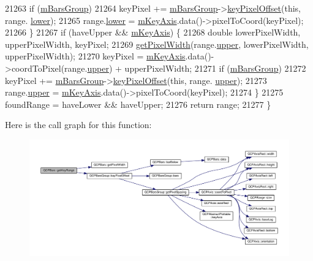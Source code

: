 \begin{DoxyCode}
21263     \textcolor{keywordflow}{if} (\hyperlink{class_q_c_p_bars_a9f59c255f3739182ca9744dff75beaa9}{mBarsGroup})
21264       keyPixel += \hyperlink{class_q_c_p_bars_a9f59c255f3739182ca9744dff75beaa9}{mBarsGroup}->\hyperlink{class_q_c_p_bars_group_a8e2ca6002e7bab49670144d048a2bcc9}{keyPixelOffset}(\textcolor{keyword}{this}, range.
      \hyperlink{class_q_c_p_range_aa3aca3edb14f7ca0c85d912647b91745}{lower});
21265     range.\hyperlink{class_q_c_p_range_aa3aca3edb14f7ca0c85d912647b91745}{lower} = \hyperlink{class_q_c_p_abstract_plottable_a426f42e254d0f8ce5436a868c61a6827}{mKeyAxis}.data()->pixelToCoord(keyPixel);
21266   \}
21267   \textcolor{keywordflow}{if} (haveUpper && \hyperlink{class_q_c_p_abstract_plottable_a426f42e254d0f8ce5436a868c61a6827}{mKeyAxis}) \{
21268     \textcolor{keywordtype}{double} lowerPixelWidth, upperPixelWidth, keyPixel;
21269     \hyperlink{class_q_c_p_bars_a794eefe4fb29b9b40583654ccbf460dc}{getPixelWidth}(range.\hyperlink{class_q_c_p_range_ae44eb3aafe1d0e2ed34b499b6d2e074f}{upper}, lowerPixelWidth, upperPixelWidth);
21270     keyPixel = \hyperlink{class_q_c_p_abstract_plottable_a426f42e254d0f8ce5436a868c61a6827}{mKeyAxis}.data()->coordToPixel(range.\hyperlink{class_q_c_p_range_ae44eb3aafe1d0e2ed34b499b6d2e074f}{upper}) + upperPixelWidth;
21271     \textcolor{keywordflow}{if} (\hyperlink{class_q_c_p_bars_a9f59c255f3739182ca9744dff75beaa9}{mBarsGroup})
21272       keyPixel += \hyperlink{class_q_c_p_bars_a9f59c255f3739182ca9744dff75beaa9}{mBarsGroup}->\hyperlink{class_q_c_p_bars_group_a8e2ca6002e7bab49670144d048a2bcc9}{keyPixelOffset}(\textcolor{keyword}{this}, range.
      \hyperlink{class_q_c_p_range_ae44eb3aafe1d0e2ed34b499b6d2e074f}{upper});
21273     range.\hyperlink{class_q_c_p_range_ae44eb3aafe1d0e2ed34b499b6d2e074f}{upper} = \hyperlink{class_q_c_p_abstract_plottable_a426f42e254d0f8ce5436a868c61a6827}{mKeyAxis}.data()->pixelToCoord(keyPixel);
21274   \}
21275   foundRange = haveLower && haveUpper;
21276   \textcolor{keywordflow}{return} range;
21277 \}
\end{DoxyCode}


Here is the call graph for this function\+:\nopagebreak
\begin{figure}[H]
\begin{center}
\leavevmode
\includegraphics[width=350pt]{class_q_c_p_bars_a93cfdc8a535f36aeb087acca49c00662_cgraph}
\end{center}
\end{figure}


